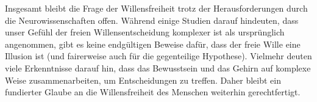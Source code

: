Insgesamt bleibt die Frage der Willensfreiheit trotz der Herausforderungen durch die Neurowissenschaften offen. Während einige Studien darauf hindeuten, dass unser Gefühl der freien Willensentscheidung komplexer ist als ursprünglich angenommen, gibt es keine endgültigen Beweise dafür, dass der freie Wille eine Illusion ist (und fairerweise auch für die gegenteilige Hypothese). Vielmehr deuten viele Erkenntnisse darauf hin, dass das Bewusstsein und das Gehirn auf komplexe Weise zusammenarbeiten, um Entscheidungen zu treffen. Daher bleibt ein fundierter Glaube an die Willensfreiheit des Menschen weiterhin gerechtfertigt.